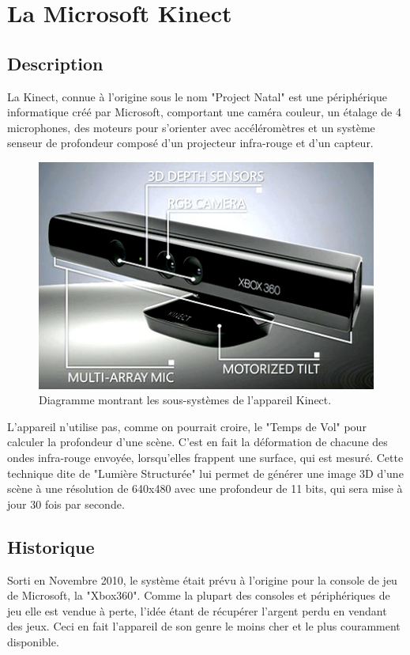\section{La Microsoft Kinect}

\subsection{Description}
La Kinect, connue à l'origine sous le nom "Project Natal" est une
périphérique informatique créé par Microsoft, comportant une caméra
couleur, un étalage de 4 microphones, des moteurs pour s'orienter avec 
accéléromètres 
et un système senseur de profondeur composé d'un 
projecteur infra-rouge et d'un capteur. 
  \begin{figure}[h!]
  \centering
  \includegraphics[width=0.8\linewidth]{images/kinect_diagram}
  \caption{Diagramme montrant les sous-systèmes de l'appareil Kinect.}
  \end{figure}
L'appareil n'utilise pas, comme on pourrait croire, le "Temps de Vol" pour
calculer la profondeur d'une scène. C'est en fait la déformation de chacune des 
ondes infra-rouge envoyée, lorsqu'elles frappent une surface, qui est mesuré. Cette technique dite de 
"Lumière Structurée"
lui permet de générer une image 3D d'une scène à une résolution de 640x480 avec 
une profondeur de 11 bits, qui sera mise à jour 30 fois par seconde.

\subsection{Historique}
Sorti en Novembre 2010, le système était prévu à l'origine pour la console
de jeu de Microsoft, la "Xbox360". Comme la plupart des consoles et
périphériques de jeu elle
est vendue à perte, l'idée étant de récupérer l'argent perdu en vendant
des jeux. Ceci en fait l'appareil de son genre le moins cher et le plus couramment
disponible.

